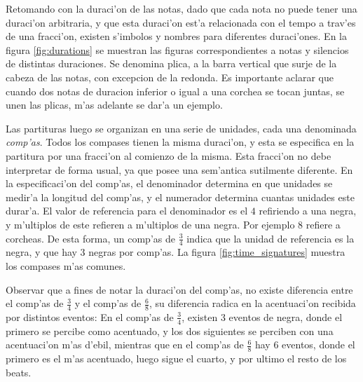 Retomando con la duraci'on de las notas, dado que cada nota no puede tener una duraci'on arbitraria, y que esta duraci'on est'a relacionada con el tempo
a trav'es de una fracci'on, existen s'imbolos y nombres para diferentes duraci'ones. 
En la figura \ref{fig:durations} se muestran las figuras correspondientes a notas y silencios de distintas duraciones. Se denomina plica, a la barra vertical que surje 
de la cabeza de las notas, con excepcion de la redonda. Es importante aclarar que cuando dos notas de duracion inferior o igual a una corchea se tocan juntas, 
se unen las plicas, m'as adelante se dar'a un ejemplo.

\begin{imagen}
    \width{12cm}
\end{imagen}

Las partituras luego se organizan en una serie de unidades, cada una denominada \emph{comp'as}. Todos los compases tienen la misma duraci'on, y esta se especifica
en la partitura por una fracci'on al comienzo de la misma. Esta fracci'on no debe interpretar de forma usual, ya que posee una sem'antica sutilmente diferente.
En la especificaci'on del comp'as, el denominador determina en que unidades se medir'a la longitud del comp'as, y el numerador determina cuantas unidades 
este durar'a. El valor de referencia para el denominador es el $4$ refiriendo a una negra, y m'ultiplos de este refieren a m'ultiplos de una negra. Por ejemplo
$8$ refiere a corcheas.  De esta forma, un comp'as de $\frac{3}{4}$ indica que la unidad de referencia es la negra, y que hay $3$ negras por comp'as.
La figura \ref{fig:time_signatures} muestra los compases m'as comunes. 

\begin{imagen}
    \width{5cm}
\end{imagen}

Observar que a fines de notar la duraci'on del comp'as, no existe diferencia entre el comp'as de $\frac{3}{4}$ y el comp'as de $\frac{6}{8}$, su diferencia
radica en la acentuaci'on recibida por distintos eventos: En el comp'as de $\frac{3}{4}$, existen 3 eventos de negra, donde el primero se percibe como acentuado, 
y los dos siguientes se perciben con una acentuaci'on m'as d'ebil, mientras que en el comp'as de $\frac{6}{8}$ hay 6 eventos, donde el primero es el m'as 
acentuado, luego sigue el cuarto, y por ultimo el resto de los beats.

